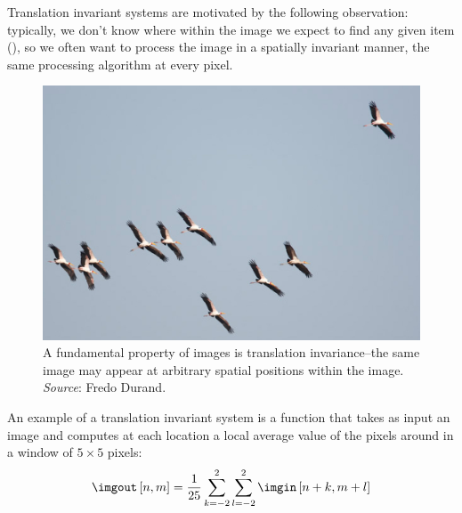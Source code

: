 Translation invariant systems are motivated by the following observation: typically, we don't know where within the image we expect to find any
given item (\fig{\ref{fig:translationInvar}}), so we often want to process the image in a spatially invariant manner, the same processing algorithm at every pixel. 


\begin{figure}
\centerline{
\includegraphics[width=1\linewidth]{figures/linear_image_filtering/fredo_birds1.jpg}
} 
\caption{A fundamental property of images is translation
  invariance--the same image may appear at arbitrary spatial positions
  within the image. {\em Source}: Fredo Durand.} 
\label{fig:translationInvar}
\end{figure}

An example of a translation invariant system is a function that takes as input an image and computes at each location a local average value of the pixels around in a window of $5 \times 5$ pixels:
\begin{equation}
\imgout \left[n,m \right] = \frac{1}{25} \sum_{k=-2}^{2} \sum_{l=-2}^{2} \imgin \left[n+k,m+l \right]
\end{equation}


